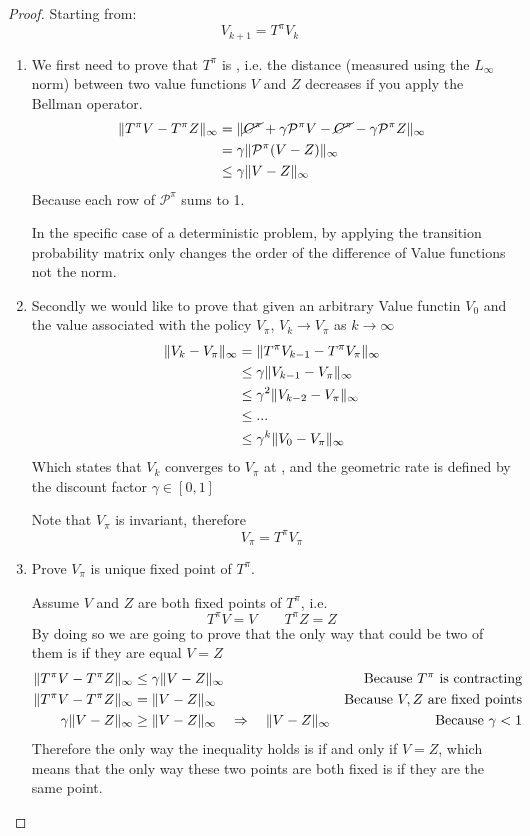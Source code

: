 \begin{proof}
Starting from:
\[V_{k+1} = T^{\pi}V_k\]
\begin{enumerate}
\item We first need to prove that $T^\pi$ is ,  i.e. the distance (measured using the $L_{\infty}$ norm) between two value functions $V$ and $Z$ decreases if you apply the Bellman operator.
\begin{align*}
\lVert T^{\pi}V - T^{\pi}Z\rVert_{\infty} &= \lVert\cancel{C^{\pi}}+\gamma \mathcal{P}^{\pi}V - \cancel{C^{\pi}} - \gamma \mathcal{P}^{\pi}Z\rVert_{\infty}\\
&= \gamma \lVert\mathcal{P}^{\pi}(V-Z)\rVert_{\infty}\\
&\le \gamma \lVert V-Z\rVert_{\infty}
\end{align*}
Because each row of $\mathcal{P}^{\pi}$ sums to 1.

In the specific case of a deterministic problem, by applying the transition probability matrix only changes the order of the difference of Value functions not the norm.

\item Secondly we would like to prove that given an arbitrary Value functin $V_0$ and the value associated with the policy $V_{\pi}$, $V_{k}\to V_{\pi}$ as $k\to\infty$
\begin{align*}
\lVert V_k - V_{\pi}\rVert_{\infty} &= \lVert T^{\pi}V_{k-1} - T^{\pi}V_{\pi}\rVert_{\infty} \\
&\le\gamma\lVert V_{k-1} - V_{\pi}\rVert_{\infty} \\
&\le \gamma^2 \lVert V_{k-2} - V_{\pi}\rVert_{\infty}\\
&\le ...\\
&\le \gamma^k \lVert V_{0}-V_{\pi}\rVert_{\infty}
\end{align*}
Which states that $V_{k}$ converges to $V_{\pi}$ at , and the geometric rate is defined by the discount factor $\gamma \in [0,1]$

Note that $V_{\pi}$ is invariant, therefore 
\[V_{\pi} = T^{\pi}V_{\pi}\]
\item Prove $V_{\pi}$ is unique fixed point of $T^{\pi}$.

Assume $V$ and $Z$ are both fixed points of $T^{\pi}$, i.e.
\[T^{\pi}V = V\qquad T^{\pi}Z = Z\]
By doing so we are going to prove that the only way that could be two of them is if they are equal $V=Z$
\begin{align*}
\lVert T^{\pi}V - T^{\pi}Z\rVert_{\infty} &\le \gamma \lVert V-Z\rVert_{\infty}&\text{Because }T^{\pi}\text{ is contracting}\\
\lVert T^{\pi}V - T^{\pi}Z\rVert_{\infty} &= \lVert V - Z\rVert_{\infty} &\text{Because }V,Z \text{ are fixed points}\\
\gamma\lVert V-Z\rVert_{\infty} &\ge \lVert V-Z\rVert_{\infty} \quad\Rightarrow\quad \lVert V-Z\rVert_{\infty} &\text{Because } \gamma <1
\end{align*}
Therefore the only way the inequality holds is if and only if $V=Z$, which means that the only way these two points are both fixed is if they are the same point.
\end{enumerate}
\end{proof}

